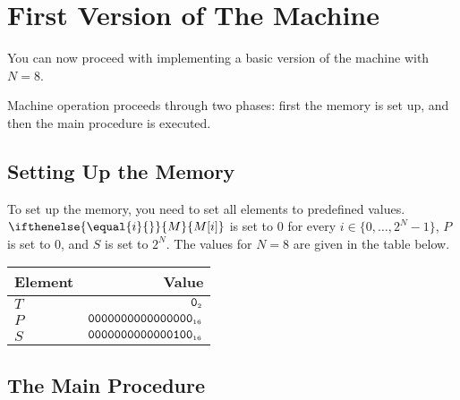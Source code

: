 \documentclass[a4paper,12pt]{article}
\newcommand{\num}[1]{\texttt{#1}}
\newcommand{\hex}[1]{\num{#1}_{\textup{\tiny 16}}}
\newcommand{\bin}[1]{\num{#1}_{\textup{\tiny 2}}}
\newcommand{\MEM}[1]{\ifthenelse{\equal{#1}{}}{M}{M[#1]}}
\newcommand{\PC}{P}
\newcommand{\SP}{S}
\newcommand{\TERM}{T}
\newcommand{\F}{\bin{0}}
\newcommand{\range}[2]{\{#1,\ldots,#2\}}
\begin{document}
\section{First Version of The Machine}

You can now proceed with implementing a basic version of the machine with $N=8$.

Machine operation proceeds through two phases: first the memory is set up, and then the main procedure is executed.

\subsection{Setting Up the Memory}

To set up the memory, you need to set all elements to predefined values.
$\MEM{i}$ is set to 0 for every $i \in \range{0}{2^N-1}$, $\PC$ is set to $0$, and $\SP$ is set to $2^N$.
The values for $N=8$ are given in the table below.

\begin{center}
  \begin{tabular}{@{}lr@{}}
    \hline
    Element  & Value                   \\
    \hline
    $\TERM$          & $\F$                      \\
    $\PC$            & $\hex{0000000000000000}$  \\
    $\SP$            & $\hex{0000000000000100}$  \\
    \hline
  \end{tabular}
\end{center}

\subsection{The Main Procedure}
\end{document}
